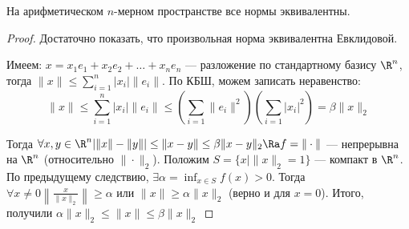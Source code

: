 \begin{corollary}
    На арифметическом \(n\)-мерном пространстве все нормы эквивалентны.
\end{corollary}
\begin{proof}
    Достаточно показать, что произвольная норма эквивалентна Евклидовой.
    
    Имеем: \(x = x_1e_1 + x_2e_2 + \dots + x_ne_n\) --- разложение по стандартному базису \(\R^n\), тогда \(\|x\| \le \sum_{i = 1}^n |x_i|\|e_i\|\). По КБШ, можем записать неравенство:
    \[\|x\| \le \sum_{i = 1}^n |x_i|\|e_i\| \le \left(\sum_{i = 1}\|e_i\|^2\right)\left(\sum_{i = 1}|x_i|^2\right) = \beta \|x\|_2\]

    Тогда \(\forall x, y \in \R^n |\|x\| - \|y\|| \le \|x - y\| \le \beta\|x - y\|_2 \Ra f = \|\cdot\|\) --- непрерывна на \(\R^n\) (относительно \(\|\cdot\|_2\)). Положим \(S = \{x | \|x\|_2 = 1\}\) --- компакт в \(\R^n\). По предыдущему следствию, \(\exists \alpha = \inf_{x \in S}f(x) > 0\). Тогда \(\forall x \ne 0 \left\|\frac{x}{\|x\|_2}\right\| \ge \alpha\) или \(\|x\| \ge \alpha \|x\|_2\) (верно и для \(x = 0\)). Итого, получили \(\alpha\|x\|_2 \le \|x\| \le \beta\|x\|_2\)
\end{proof}
